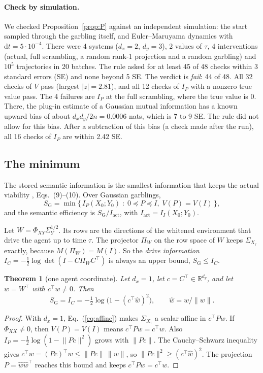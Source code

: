 \documentclass[11pt]{article}
\newtheorem{theorem}{Theorem}
\newcommand{\Iact}{I_{\mathrm{act}}}
\newcommand{\SG}{S_{\mathrm{G}}}
\begin{document}
\paragraph{Check by simulation.} We checked Proposition~\ref{prop:P} against an independent simulation: the start
sampled through the garbling itself, and Euler--Maruyama dynamics with $\mathrm{d}t=5\cdot10^{-4}$. There were 4 systems
($d_x=2$, $d_y=3$), 2 values of $\tau$, 4 interventions (actual, full scrambling, a random rank-1 projection and a
random garbling) and $10^5$ trajectories in 20 batches. The rule asked for at least 45 of 48 checks within 3 standard
errors (SE) and none beyond 5 SE. The verdict is \emph{fail}: 44 of 48. All 32 checks of $V$ pass (largest
$|z|=2.81$), and all 12 checks of $I_P$ with a nonzero true value pass. The 4 failures are $I_P$ at the full
scrambling, where the true value is 0. There, the plug-in estimate of a Gaussian mutual information has a known upward
bias of about $d_xd_y/2n=0.0006$ nats, which is 7 to 9 SE. The rule did not allow for this bias. After a subtraction of
this bias (a check made after the run), all 16 checks of $I_P$ are within 2.42 SE.

\subsection{The minimum}
The stored semantic information is the smallest information that keeps the actual viability
\cite{KolchinskyWolpert18}, Eqs.~(9)--(10). Over Gaussian garblings,
\begin{equation}
  \SG = \min\bigl\{\,I_P(X_0;Y_0)\;:\;0\preceq P\preceq I,\; V(P)=V(I)\,\bigr\},
\end{equation}
and the semantic efficiency is $\SG/\Iact$, with $\Iact=I_{I}(X_0;Y_0)$.

Let $W=\Phi_{XY}\Sigma_Y^{1/2}$. Its rows are the directions of the whitened environment that drive the agent up to
time $\tau$. The projector $\Pi_W$ on the row space of $W$ keeps $\Sigma_{X_\tau}$ exactly, because
$M(\Pi_W)=M(I)$. So the \emph{drive information} $I_C=-\tfrac12\log\det(I-C\Pi_WC^\top)$ is always an upper bound,
$\SG\le I_C$.

\begin{theorem}[one agent coordinate]\label{thm:dx1}
Let $d_x=1$, let $c=C^\top\in\mathbb{R}^{d_y}$, and let $w=W^\top$ with $c^\top w\neq0$. Then
\begin{equation}
  \SG = I_C = -\tfrac12\log\bigl(1-(c^\top\hat w)^2\bigr), \qquad \hat w = w/\lVert w\rVert .
\end{equation}
\end{theorem}
\begin{proof}
With $d_x=1$, Eq.~(\ref{eq:affine}) makes $\Sigma_{X_\tau}$ a scalar affine in $c^\top Pw$. If
$\Phi_{XX}\neq0$, then $V(P)=V(I)$ means $c^\top Pw=c^\top w$. Also $I_P=-\tfrac12\log(1-\lVert Pc\rVert^2)$ grows with $\lVert Pc\rVert$. The Cauchy--Schwarz
inequality gives $c^\top w=(Pc)^\top w\le\lVert Pc\rVert\,\lVert w\rVert$, so $\lVert Pc\rVert^2\ge(c^\top\hat w)^2$.
The projection $P=\hat w\hat w^\top$ reaches this bound and keeps $c^\top Pw=c^\top w$.
\end{proof}
\end{document}
